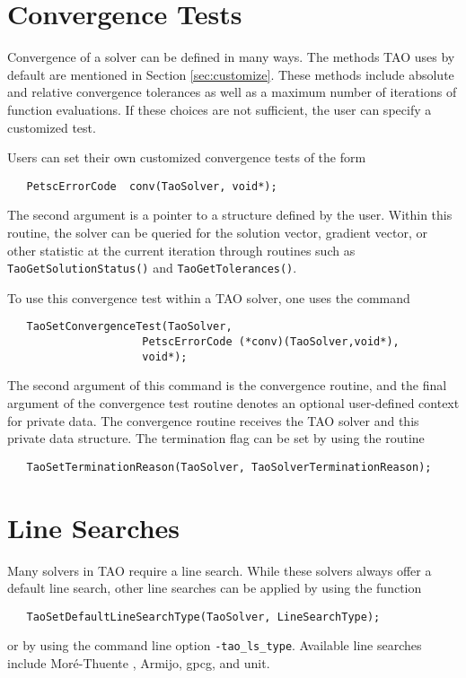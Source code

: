 \section{Convergence Tests}
\label{sec:Taoconvergence}

Convergence of a solver can be defined in many ways.
The methods TAO uses by default are mentioned in 
Section \ref{sec:customize}.
These methods include absolute and relative convergence tolerances as well
as a maximum number of iterations of function evaluations.
If these choices are not sufficient, 
the user can specify a customized test. 

Users can set their own customized convergence tests of the form
\begin{verbatim}
   PetscErrorCode  conv(TaoSolver, void*);
\end{verbatim}
\noindent
The second argument is a pointer to a structure defined by the user.
Within this routine, the solver
can be queried for the solution vector, gradient vector,
or other statistic at the current iteration through routines such as
{\tt TaoGetSolutionStatus()} and  {\tt TaoGetTolerances()}.

To use this convergence test within a TAO solver, one uses
the command 
\begin{verbatim}
   TaoSetConvergenceTest(TaoSolver,
                     PetscErrorCode (*conv)(TaoSolver,void*),
                     void*);
\end{verbatim}
\noindent
The second argument of this command is the convergence routine, and the
final argument of the convergence test routine denotes an optional 
user-defined context for private data.  
The convergence routine receives the TAO solver and this private data
structure. 
The termination flag can be set by using the routine
\begin{verbatim}
   TaoSetTerminationReason(TaoSolver, TaoSolverTerminationReason);
\end{verbatim}
\noindent



\section{Line Searches} 
\label{sec:TaoLineSearch}

Many solvers in TAO require a line search.  While these solvers always
offer a default line search, other line searches can be applied by
using the function
\begin{verbatim}
   TaoSetDefaultLineSearchType(TaoSolver, LineSearchType);
\end{verbatim}
or by using the command line option  {\tt -tao\_ls\_type}.  
Available line searches 
include Mor\'{e}-Thuente \cite{more:92}, Armijo, gpcg, and unit.

